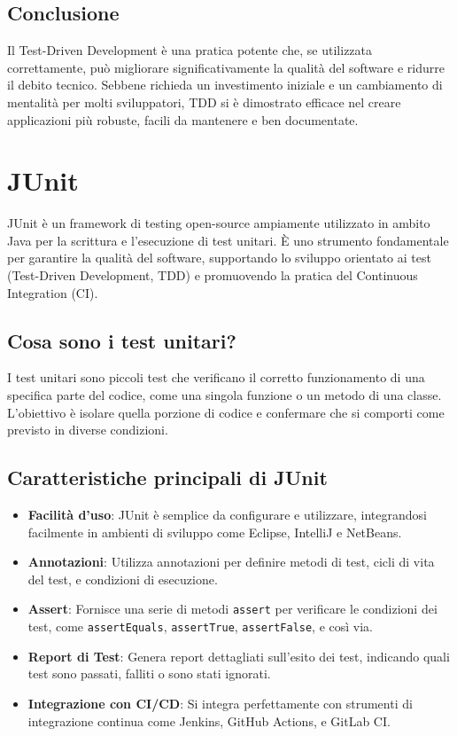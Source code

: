 \documentclass{article}
\begin{document}
\subsection{Conclusione}
Il Test-Driven Development è una pratica potente che, se utilizzata correttamente, può migliorare significativamente la qualità del software e ridurre il debito tecnico. Sebbene richieda un investimento iniziale e un cambiamento di mentalità per molti sviluppatori, TDD si è dimostrato efficace nel creare applicazioni più robuste, facili da mantenere e ben documentate.


\section{JUnit}
JUnit è un framework di testing open-source ampiamente utilizzato in ambito Java per la scrittura e l'esecuzione di test unitari. È uno strumento fondamentale per garantire la qualità del software, supportando lo sviluppo orientato ai test (Test-Driven Development, TDD) e promuovendo la pratica del Continuous Integration (CI).

\subsection{Cosa sono i test unitari?}
I test unitari sono piccoli test che verificano il corretto funzionamento di una specifica parte del codice, come una singola funzione o un metodo di una classe. L'obiettivo è isolare quella porzione di codice e confermare che si comporti come previsto in diverse condizioni.

\subsection{Caratteristiche principali di JUnit}
\begin{itemize}
    \item \textbf{Facilità d'uso}: JUnit è semplice da configurare e utilizzare, integrandosi facilmente in ambienti di sviluppo come Eclipse, IntelliJ e NetBeans.
    \item \textbf{Annotazioni}: Utilizza annotazioni per definire metodi di test, cicli di vita del test, e condizioni di esecuzione.
    \item \textbf{Assert}: Fornisce una serie di metodi \texttt{assert} per verificare le condizioni dei test, come \texttt{assertEquals}, \texttt{assertTrue}, \texttt{assertFalse}, e così via.
    \item \textbf{Report di Test}: Genera report dettagliati sull'esito dei test, indicando quali test sono passati, falliti o sono stati ignorati.
    \item \textbf{Integrazione con CI/CD}: Si integra perfettamente con strumenti di integrazione continua come Jenkins, GitHub Actions, e GitLab CI.
\end{itemize}
\end{document}
